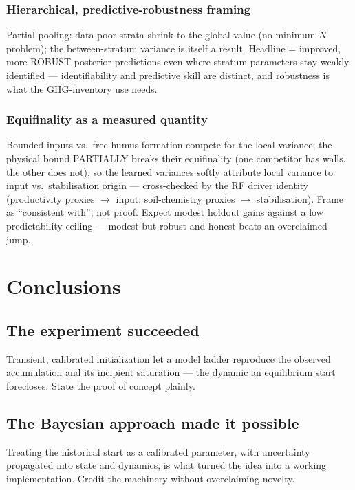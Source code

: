 \documentclass[11pt]{article}
\begin{document}
{\subsubsection{Hierarchical, predictive-robustness framing}
Partial pooling: data-poor strata shrink to the global value (no minimum-$N$
problem); the between-stratum variance is itself a result. Headline = improved,
more ROBUST posterior predictions even where stratum parameters stay weakly
identified --- identifiability and predictive skill are distinct, and robustness is
what the GHG-inventory use needs.

\subsubsection{Equifinality as a measured quantity}
Bounded inputs vs.\ free humus formation compete for the local variance; the
physical bound PARTIALLY breaks their equifinality (one competitor has walls, the
other does not), so the learned variances softly attribute local variance to
input vs.\ stabilisation origin --- cross-checked by the RF driver identity
(productivity proxies $\to$ input; soil-chemistry proxies $\to$ stabilisation).
Frame as ``consistent with'', not proof. Expect modest holdout gains against a low
predictability ceiling --- modest-but-robust-and-honest beats an overclaimed jump.
}
\fi

\section{Conclusions}

\subsection{The experiment succeeded}
Transient, calibrated initialization let a model ladder reproduce the observed
accumulation and its incipient saturation --- the dynamic an equilibrium start
forecloses. State the proof of concept plainly.

\subsection{The Bayesian approach made it possible}
Treating the historical start as a calibrated parameter, with uncertainty
propagated into state and dynamics, is what turned the idea into a working
implementation. Credit the machinery without overclaiming novelty.
\end{document}
